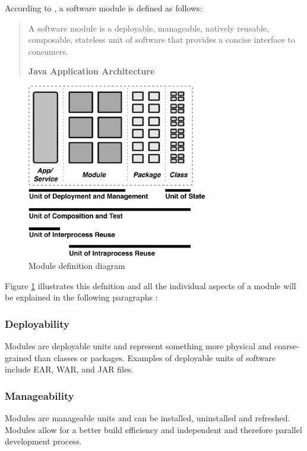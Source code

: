 According to \citeauthor{Knoernschild:2012}, a software module is defined as follows:

\begin{quote}
A software module is a deployable, manageable, natively reusable, composable, stateless unit of software that provides a concise interface to consumers. 

\hfill \textbf{Java Application Architecture}

\hfill \citeauthor{Knoernschild:2012} \cite{Knoernschild:2012}
\end{quote}

\begin{figure}[H]
\centering
\includegraphics[width=0.7\textwidth]{module.jpeg}
\caption{Module definition diagram}
\label{fig:module}
\end{figure}

Figure \ref{fig:module} illustrates this defnition and all the individual aspects of a module will be explained in the following paragraphs \cite{Knoernschild:2012}:

\newpage
\subsubsection{Deployability}
Modules are deployable units and represent something more physical and coarse-grained than classes or packages. Examples of deployable units of software include EAR, WAR, and JAR files.

\subsubsection{Manageability}
Modules are manageable units and can be installed, uninstalled and refreshed. Modules allow for a better build efficiency and independent and therefore parallel development process.


